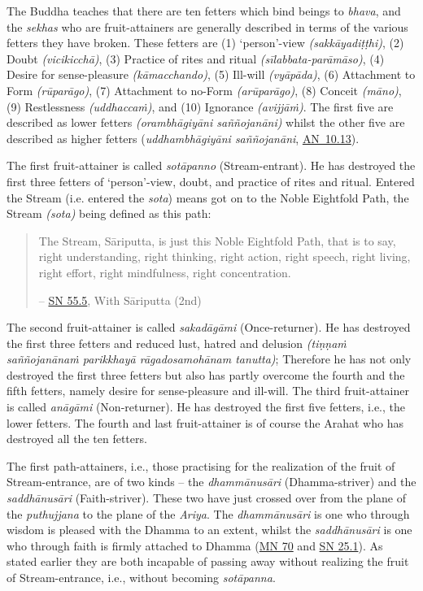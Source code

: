 The Buddha teaches that there are ten fetters which bind beings to \emph{bhava}, and the \emph{sekhas} who are fruit-attainers are generally described in terms of the various fetters they have broken. These fetters are (1) `person'-view \emph{(sakkāyadiṭṭhi)}, (2) Doubt \emph{(vicikicchā)}, (3) Practice of rites and ritual \emph{(sīlabbata-parāmāso)}, (4) Desire for sense-pleasure \emph{(kāmacchando)}, (5) Ill-will \emph{(vyāpāda)}, (6) Attachment to Form \emph{(rūparāgo)}, (7) Attachment to no-Form \emph{(arūparāgo)}, (8) Conceit \emph{(māno)}, (9) Restlessness \emph{(uddhaccaṁ)}, and (10) Ignorance \emph{(avijjāṁ)}. The first five are described as lower fetters \emph{(orambhāgiyāni saññojanāni)} whilst the other five are described as higher fetters (\emph{uddhambhāgiyāni saññojanāni}, \href{https://suttacentral.net/an10.13/en/bodhi}{AN~10.13}).

The first fruit-attainer is called \emph{sotāpanno} (Stream-entrant). He has destroyed the first three fetters of `person'-view, doubt, and practice of rites and ritual. Entered the Stream (i.e. entered the \emph{sota}) means got on to the Noble Eightfold Path, the Stream \emph{(sota)} being defined as this path:

\begin{quote}
The Stream, Sāriputta, is just this Noble Eightfold Path, that is to say, right understanding, right thinking, right action, right speech, right living, right effort, right mindfulness, right concentration.

 -- \href{https://suttacentral.net/sn55.5/en/sujato}{SN 55.5}, With Sāriputta (2nd)
\end{quote}

The second fruit-attainer is called \emph{sakadāgāmi} (Once-returner). He has destroyed the first three fetters and reduced lust, hatred and delusion \emph{(tiṇṇaṁ saññojanānaṁ parikkhayā rāgadosamohānam tanutta)}; Therefore he has not only destroyed the first three fetters but also has partly overcome the fourth and the fifth fetters, namely desire for sense-pleasure and ill-will. The third fruit-attainer is called \emph{anāgāmi} (Non-returner). He has destroyed the first five fetters, i.e., the lower fetters. The fourth and last fruit-attainer is of course the Arahat who has destroyed all the ten fetters.

The first path-attainers, i.e., those practising for the realization of the fruit of Stream-entrance, are of two kinds -- the \emph{dhammānusāri} (Dhamma-striver) and the \emph{saddhānusāri} (Faith-striver). These two have just crossed over from the plane of the \emph{puthujjana} to the plane of the \emph{Ariya}. The \emph{dhammānusāri} is one who through wisdom is pleased with the Dhamma to an extent, whilst the \emph{saddhānusāri} is one who through faith is firmly attached to Dhamma (\href{https://suttacentral.net/mn70/en/bodhi}{MN 70} and \href{https://suttacentral.net/sn25.1/en/sujato}{SN 25.1}). As stated earlier they are both incapable of passing away without realizing the fruit of Stream-entrance, i.e., without becoming \emph{sotāpanna}.

